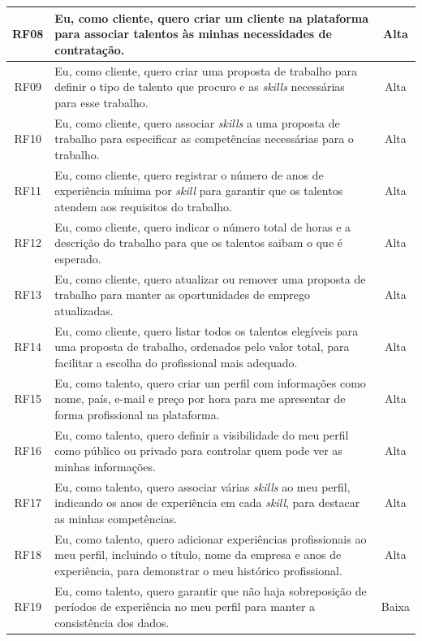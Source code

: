 \begin{center}
\begin{longtable}{|c|p{9cm}|c|}
    RF08 & Eu, como cliente, quero criar um cliente na plataforma para associar talentos às minhas necessidades de contratação. & Alta \\
    \hline
    RF09 & Eu, como cliente, quero criar uma proposta de trabalho para definir o tipo de talento que procuro e as \textit{skills} necessárias para esse trabalho. & Alta \\
    \hline
    RF10 & Eu, como cliente, quero associar \textit{skills} a uma proposta de trabalho para especificar as competências necessárias para o trabalho. & Alta \\
    \hline
    RF11 & Eu, como cliente, quero registrar o número de anos de experiência mínima por \textit{skill} para garantir que os talentos atendem aos requisitos do trabalho. & Alta \\
    \hline
    RF12 & Eu, como cliente, quero indicar o número total de horas e a descrição do trabalho para que os talentos saibam o que é esperado. & Alta \\
    \hline
    RF13 & Eu, como cliente, quero atualizar ou remover uma proposta de trabalho para manter as oportunidades de emprego atualizadas. & Alta \\
    \hline
    RF14 & Eu, como cliente, quero listar todos os talentos elegíveis para uma proposta de trabalho, ordenados pelo valor total, para facilitar a escolha do profissional mais adequado. & Alta \\
    \hline
    RF15 & Eu, como talento, quero criar um perfil com informações como nome, país, e-mail e preço por hora para me apresentar de forma profissional na plataforma. & Alta \\
    \hline
    RF16 & Eu, como talento, quero definir a visibilidade do meu perfil como público ou privado para controlar quem pode ver as minhas informações. & Alta \\
    \hline
    RF17 & Eu, como talento, quero associar várias \textit{skills} ao meu perfil, indicando os anos de experiência em cada \textit{skill}, para destacar as minhas competências. & Alta \\
    \hline
    RF18 & Eu, como talento, quero adicionar experiências profissionais ao meu perfil, incluindo o título, nome da empresa e anos de experiência, para demonstrar o meu histórico profissional. & Alta \\
    \hline
    RF19 & Eu, como talento, quero garantir que não haja sobreposição de períodos de experiência no meu perfil para manter a consistência dos dados. & Baixa \\
    \hline
\end{longtable}
\end{center}

